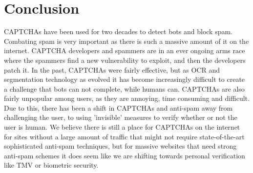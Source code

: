 \documentclass[a4paper]{IEEEtran}
\begin{document}
\section{Conclusion}
CAPTCHAs have been used for two decades to detect bots and block spam. Combating spam is very important as there is such a massive amount of it on the internet. CAPTCHA developers and spammers are in an ever ongoing arms race where the spammers find a new vulnerability to exploit, and then the developers patch it. In the past, CAPTCHAs were fairly effective, but as OCR and segmentation technology as evolved it has become increasingly difficult to create a challenge that bots can not complete, while humans can. CAPTCHAs are also fairly unpopular among users, as they are annoying, time consuming and difficult. Due to this, there has been a shift in CAPTCHAs and anti-spam away from challenging the user, to using 'invisible' measures to verify whether or not the user is human. We believe there is still a place for CAPTCHAs on the internet for sites without a large amount of traffic that might not require state-of-the-art sophisticated anti-spam techniques, but for massive websites that need strong anti-spam schemes it does seem like we are shifting towards personal verification like TMV or biometric security. 
\end{document}
